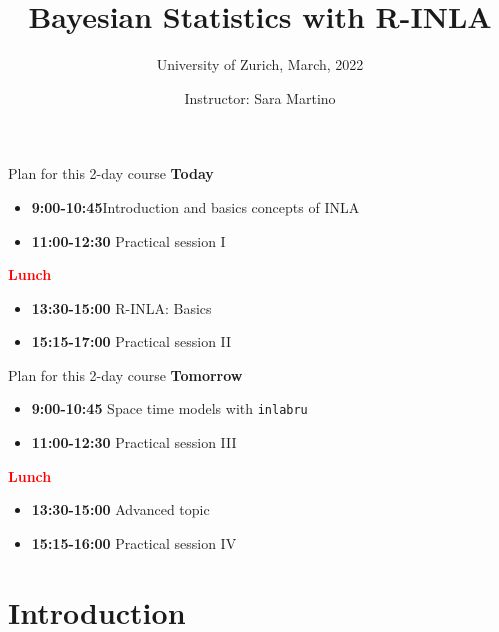 \documentclass[
  ignorenonframetext,
]{beamer}
\title{Bayesian Statistics with R-INLA}
\subtitle{University of Zurich, March, 2022}
\author{Instructor: Sara Martino}
\date{}
\providecommand{\tightlist}{%
  \setlength{\itemsep}{0pt}\setlength{\parskip}{0pt}}
\begin{document}
\frame{\titlepage}

\begin{frame}[allowframebreaks]
  \tableofcontents[hideallsubsections]
\end{frame}
\begin{frame}
\end{frame}

\begin{frame}{Plan for this 2-day course}
\protect\hypertarget{plan-for-this-2-day-course}{}
\textbf{Today}

\begin{itemize}
\tightlist
\item
  \textbf{9:00-10:45}Introduction and basics concepts of INLA
\item
  \textbf{11:00-12:30} Practical session I
\end{itemize}

\textbf{\textcolor{red}{Lunch}}

\begin{itemize}
\tightlist
\item
  \textbf{13:30-15:00} R-INLA: Basics
\item
  \textbf{15:15-17:00} Practical session II
\end{itemize}
\end{frame}

\begin{frame}[fragile]{Plan for this 2-day course}
\protect\hypertarget{plan-for-this-2-day-course-1}{}
\textbf{Tomorrow}

\begin{itemize}
\tightlist
\item
  \textbf{9:00-10:45} Space time models with \texttt{inlabru}
\item
  \textbf{11:00-12:30} Practical session III
\end{itemize}

\textbf{\textcolor{red}{Lunch}}

\begin{itemize}
\tightlist
\item
  \textbf{13:30-15:00} Advanced topic
\item
  \textbf{15:15-16:00} Practical session IV
\end{itemize}
\end{frame}

\hypertarget{introduction}{%
\section{Introduction}\label{introduction}}
\end{document}

